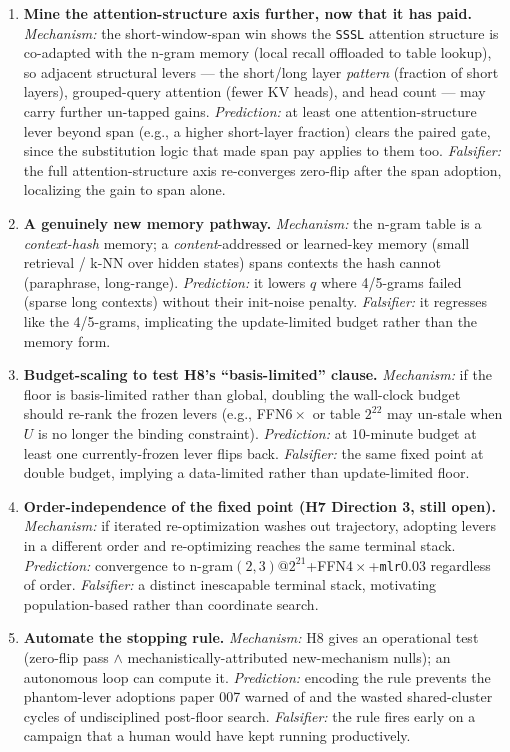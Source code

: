\documentclass{article}
\begin{document}
\begin{enumerate}
    \item \textbf{Mine the attention-structure axis further, now that it has paid.} \emph{Mechanism:} the short-window-span win shows the \texttt{SSSL} attention structure is co-adapted with the n-gram memory (local recall offloaded to table lookup), so adjacent structural levers --- the short/long layer \emph{pattern} (fraction of short layers), grouped-query attention (fewer KV heads), and head count --- may carry further un-tapped gains. \emph{Prediction:} at least one attention-structure lever beyond span (e.g., a higher short-layer fraction) clears the paired gate, since the substitution logic that made span pay applies to them too. \emph{Falsifier:} the full attention-structure axis re-converges zero-flip after the span adoption, localizing the gain to span alone.
    \item \textbf{A genuinely new memory pathway.} \emph{Mechanism:} the n-gram table is a \emph{context-hash} memory; a \emph{content}-addressed or learned-key memory (small retrieval / k-NN over hidden states) spans contexts the hash cannot (paraphrase, long-range). \emph{Prediction:} it lowers $q$ where 4/5-grams failed (sparse long contexts) without their init-noise penalty. \emph{Falsifier:} it regresses like the 4/5-grams, implicating the update-limited budget rather than the memory form.
    \item \textbf{Budget-scaling to test H8's ``basis-limited'' clause.} \emph{Mechanism:} if the floor is basis-limited rather than global, doubling the wall-clock budget should re-rank the frozen levers (e.g., FFN$6\times$ or table $2^{22}$ may un-stale when $U$ is no longer the binding constraint). \emph{Prediction:} at $10$-minute budget at least one currently-frozen lever flips back. \emph{Falsifier:} the same fixed point at double budget, implying a data-limited rather than update-limited floor.
    \item \textbf{Order-independence of the fixed point (H7 Direction 3, still open).} \emph{Mechanism:} if iterated re-optimization washes out trajectory, adopting levers in a different order and re-optimizing reaches the same terminal stack. \emph{Prediction:} convergence to n-gram$(2,3)$@$2^{21}$+FFN$4\times$+\texttt{mlr}$0.03$ regardless of order. \emph{Falsifier:} a distinct inescapable terminal stack, motivating population-based rather than coordinate search.
    \item \textbf{Automate the stopping rule.} \emph{Mechanism:} H8 gives an operational test (zero-flip pass $\wedge$ mechanistically-attributed new-mechanism nulls); an autonomous loop can compute it. \emph{Prediction:} encoding the rule prevents the phantom-lever adoptions paper 007 warned of and the wasted shared-cluster cycles of undisciplined post-floor search. \emph{Falsifier:} the rule fires early on a campaign that a human would have kept running productively.
\end{enumerate}
\end{document}
